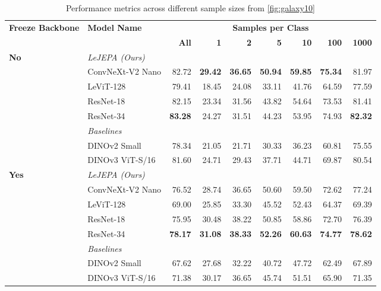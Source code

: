 \begin{table}[t!]
\caption{Performance metrics across different sample sizes from \cref{fig:galaxy10}}
\label{tab:galaxy10}
\centering
\begin{tabular}{llrrrrrrr}
\toprule
\textbf{Freeze Backbone} & \textbf{Model Name} & \multicolumn{7}{c}{\textbf{Samples per Class}} \\
\cmidrule(lr){3-9}
 &  & \textbf{All} & \textbf{1} & \textbf{2} & \textbf{5} & \textbf{10} & \textbf{100} & \textbf{1000} \\
\midrule
\multirow[c]{6}{*}{\textbf{No}} 
 & \multicolumn{8}{l}{\textit{LeJEPA (Ours)}} \\
 & ConvNeXt-V2 Nano & 82.72 & \textbf{29.42} & \textbf{36.65} & \textbf{50.94} & \textbf{59.85} & \textbf{75.34} & 81.97 \\
 & LeViT-128 & 79.41 & 18.45 & 24.08 & 33.11 & 41.76 & 64.59 & 77.59 \\
 & ResNet-18 & 82.15 & 23.34 & 31.56 & 43.82 & 54.64 & 73.53 & 81.41 \\
 & ResNet-34 & \textbf{83.28} & 24.27 & 31.51 & 44.23 & 53.95 & 74.93 & \textbf{82.32} \\
\cmidrule(lr){2-9}
 & \multicolumn{8}{l}{\textit{Baselines}} \\
 & DINOv2 Small & 78.34 & 21.05 & 21.71 & 30.33 & 36.23 & 60.81 & 75.55 \\
 & DINOv3 ViT-S/16 & 81.60 & 24.71 & 29.43 & 37.71 & 44.71 & 69.87 & 80.54 \\
\midrule
\multirow[c]{6}{*}{\textbf{Yes}} 
 & \multicolumn{8}{l}{\textit{LeJEPA (Ours)}} \\
 & ConvNeXt-V2 Nano & 76.52 & 28.74 & 36.65 & 50.60 & 59.50 & 72.62 & 77.24 \\
 & LeViT-128 & 69.00 & 25.85 & 33.30 & 45.52 & 52.43 & 64.37 & 69.39 \\
 & ResNet-18 & 75.95 & 30.48 & 38.22 & 50.85 & 58.86 & 72.70 & 76.39 \\
 & ResNet-34 & \textbf{78.17} & \textbf{31.08} & \textbf{38.33} & \textbf{52.26} & \textbf{60.63} & \textbf{74.77} & \textbf{78.62} \\
\cmidrule(lr){2-9}
 & \multicolumn{8}{l}{\textit{Baselines}} \\
 & DINOv2 Small & 67.62 & 27.68 & 32.22 & 40.72 & 47.72 & 62.49 & 67.89 \\
 & DINOv3 ViT-S/16 & 71.38 & 30.17 & 36.65 & 45.74 & 51.51 & 65.90 & 71.35 \\
\bottomrule
\end{tabular}
\end{table}






